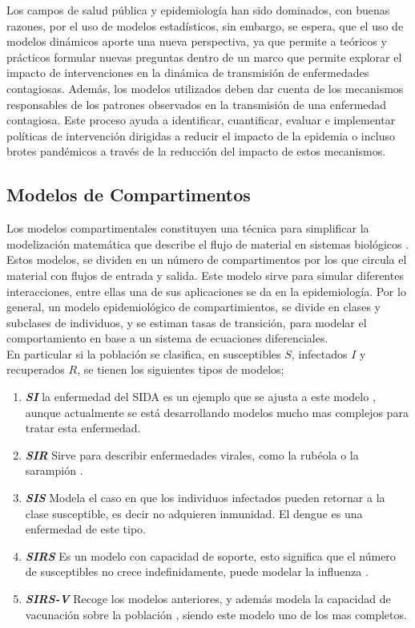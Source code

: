 \documentclass[journal]{IEEEtran}
\begin{document}
Los campos de salud pública y epidemiología han sido dominados, con buenas
razones, por el uso de modelos estadísticos, sin embargo, se espera,
que el uso de modelos dinámicos aporte una nueva perspectiva, ya que permite a
teóricos y prácticos formular nuevas preguntas dentro de un marco que permite
explorar el impacto de intervenciones en la dinámica de transmisión de
enfermedades contagiosas.
Además, los modelos utilizados deben dar cuenta de los mecanismos responsables
de los patrones observados en la transmisión de una enfermedad contagiosa.
Este proceso ayuda a identificar, cuantificar, evaluar e implementar políticas
de intervención dirigidas a reducir el impacto de la epidemia o incluso brotes
pandémicos a través de la reducción del impacto de estos mecanismos.

\subsection{Modelos de Compartimentos}\label{Modelos}
Los modelos compartimentales constituyen una técnica para simplificar la
modelización matemática que describe el flujo de material en sistemas
biológicos \cite{compartimientos}.
Estos modelos, se dividen en un número de compartimentos por los que circula el
material con flujos de entrada y salida. Este modelo
sirve para simular diferentes interacciones, entre ellas una de sus
aplicaciones se da en la epidemiología. Por lo general, un modelo
epidemiológico de compartimientos, se divide en clases y subclases de
individuos, y se estiman tasas de transición, para modelar el comportamiento
en base a un sistema de ecuaciones diferenciales.\\
\newline
En particular si la población se clasifica, en susceptibles $S$, infectados $I$
y recuperados $R$, se tienen los siguientes tipos de modelos;
\begin{enumerate}
	\item \textbf{\textit{SI}} la enfermedad del SIDA es un ejemplo que se
	      ajusta a este modelo \cite{SIDA}, aunque actualmente se está desarrollando
	      modelos mucho mas complejos para tratar esta enfermedad.
	\item \textbf{\textit{SIR}} Sirve para describir enfermedades virales,
	      como la rubéola o la sarampión \cite{Rubeola}.
	\item \textbf{\textit{SIS}} Modela el caso en que los individuos
	      infectados pueden retornar a la clase susceptible, es decir no adquieren
	      inmunidad. El dengue \cite{Dengue} es una enfermedad de este tipo.
	\item \textbf{\textit{SIRS}} Es un modelo con capacidad de soporte,
	      esto significa que el número de susceptibles no crece indefinidamente, puede
	      modelar la influenza \cite{Influenza}.
	\item \textbf{\textit{SIRS-V}} Recoge los modelos anteriores, y además
	      modela la capacidad de vacunación sobre la población \cite{Vacunacion}, siendo
	      este modelo uno de los mas completos.
\end{enumerate}
\end{document}
